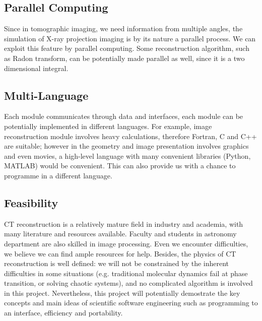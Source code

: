 \documentclass[11]{article}
\begin{document}
\subsection{Parallel Computing}
	Since in tomographic imaging, we need information from multiple angles, the simulation of X-ray projection imaging is by its nature a parallel process. We can exploit this feature by parallel computing. Some reconstruction algorithm, such as Radon transform, can be potentially made parallel as well, since it is a two dimensional integral.

\subsection{Multi-Language}
	Each module communicates through data and interfaces, each module can be potentially implemented in different languages. For example, image reconstruction module involves heavy calculations, therefore Fortran, C and C++ are suitable; however in the geometry and image presentation involves graphics and even movies, a high-level language with many convenient libraries (Python, MATLAB) would be convenient. This can also provide us with a chance to programme in a different language.

\subsection{Feasibility}
	CT reconstruction is a relatively mature field in industry and academia, with many literature and resources available. Faculty and students in astronomy department are also skilled in image processing. Even we encounter difficulties, we believe we can find ample resources for help. Besides, the physics of CT reconstruction is well defined: we will not be constrained by the inherent difficulties in some situations (e.g. traditional molecular dynamics fail at phase transition, or solving chaotic systems), and no complicated algorithm is involved in this project. Nevertheless, this project will potentially demostrate the key concepts and main ideas of scientific software engineering such as programming to an interface, efficiency and portability.
	
\end{document}
